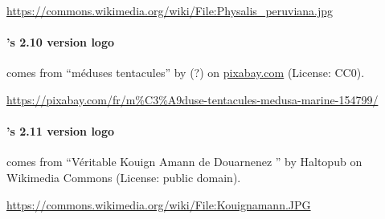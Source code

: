 \url{https://commons.wikimedia.org/wiki/File:Physalis_peruviana.jpg}
 

\paragraph{\imitator{}'s 2.10 version logo} comes from ``méduses tentacules'' by (?) on \url{pixabay.com}
	(License: CC0).

\url{https://pixabay.com/fr/m%C3%A9duse-tentacules-medusa-marine-154799/}

\paragraph{\imitator{}'s 2.11 version logo} comes from ``Véritable Kouign Amann de Douarnenez '' by Haltopub on Wikimedia Commons
	(License: public domain).

\url{https://commons.wikimedia.org/wiki/File:Kouignamann.JPG}
 
 
